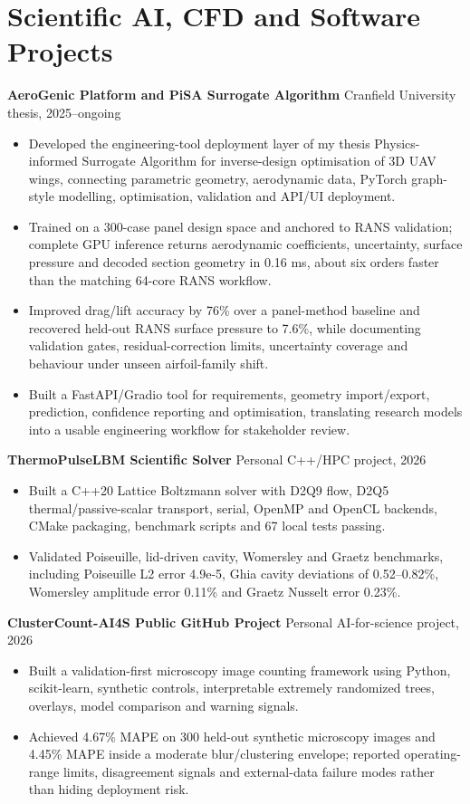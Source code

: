 \documentclass[10pt,a4paper]{article}
\begin{document}
\section{Scientific AI, CFD and Software Projects}
\textbf{AeroGenic Platform and PiSA Surrogate Algorithm} \hfill Cranfield University thesis, 2025--ongoing
\begin{itemize}
  \item Developed the engineering-tool deployment layer of my thesis Physics-informed Surrogate Algorithm for inverse-design optimisation of 3D UAV wings, connecting parametric geometry, aerodynamic data, PyTorch graph-style modelling, optimisation, validation and API/UI deployment.
  \item Trained on a 300-case panel design space and anchored to RANS validation; complete GPU inference returns aerodynamic coefficients, uncertainty, surface pressure and decoded section geometry in 0.16 ms, about six orders faster than the matching 64-core RANS workflow.
  \item Improved drag/lift accuracy by 76\% over a panel-method baseline and recovered held-out RANS surface pressure to 7.6\%, while documenting validation gates, residual-correction limits, uncertainty coverage and behaviour under unseen airfoil-family shift.
  \item Built a FastAPI/Gradio tool for requirements, geometry import/export, prediction, confidence reporting and optimisation, translating research models into a usable engineering workflow for stakeholder review.
\end{itemize}

\textbf{ThermoPulseLBM Scientific Solver} \hfill Personal C++/HPC project, 2026
\begin{itemize}
  \item Built a C++20 Lattice Boltzmann solver with D2Q9 flow, D2Q5 thermal/passive-scalar transport, serial, OpenMP and OpenCL backends, CMake packaging, benchmark scripts and 67 local tests passing.
  \item Validated Poiseuille, lid-driven cavity, Womersley and Graetz benchmarks, including Poiseuille L2 error 4.9e-5, Ghia cavity deviations of 0.52--0.82\%, Womersley amplitude error 0.11\% and Graetz Nusselt error 0.23\%.
\end{itemize}

\textbf{ClusterCount-AI4S Public GitHub Project} \hfill Personal AI-for-science project, 2026
\begin{itemize}
  \item Built a validation-first microscopy image counting framework using Python, scikit-learn, synthetic controls, interpretable extremely randomized trees, overlays, model comparison and warning signals.
  \item Achieved 4.67\% MAPE on 300 held-out synthetic microscopy images and 4.45\% MAPE inside a moderate blur/clustering envelope; reported operating-range limits, disagreement signals and external-data failure modes rather than hiding deployment risk.
\end{itemize}
\end{document}
